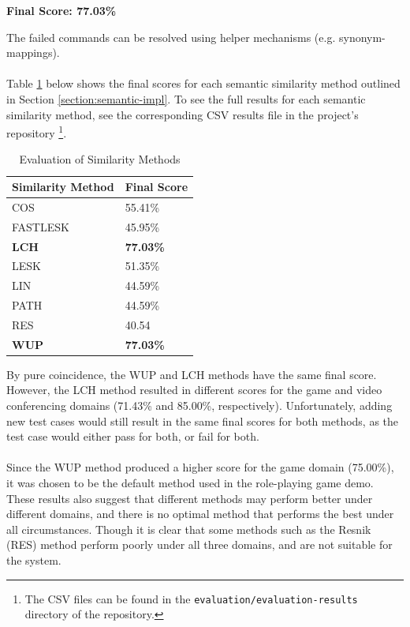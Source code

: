 \documentclass[11pt]{article}
\begin{document}
\begin{center}
\textbf{Final Score: 77.03\%}
\end{center}

The failed commands can be resolved using helper mechanisms (e.g. synonym-mappings).
\\
\\
Table \ref{table:method-results} below shows the final scores for each semantic similarity method outlined in Section \ref{section:semantic-impl}. To see the full results for each semantic similarity method, see the corresponding CSV results file in the project's repository \footnote{The CSV files can be found in the \texttt{evaluation/evaluation-results} directory of the repository.}.

\begin{table}[H]
\centering
\caption{Evaluation of Similarity Methods}
\label{table:method-results}
\begin{tabular}{l|l}
\textbf{Similarity Method} & \textbf{Final Score} \\ \hline
COS                        & 55.41\%              \\ \hline
FASTLESK                   & 45.95\%              \\ \hline
\textbf{LCH}               & \textbf{77.03\%}     \\ \hline
LESK                       & 51.35\%              \\ \hline
LIN                        & 44.59\%              \\ \hline
PATH                       & 44.59\%              \\ \hline
RES                        & 40.54                \\ \hline
\textbf{WUP}               & \textbf{77.03\%}     \\ \hline
\end{tabular}
\end{table}

By pure coincidence, the WUP and LCH methods have the same final score. However, the LCH method resulted in different scores for the game and video conferencing domains (71.43\% and 85.00\%, respectively). Unfortunately, adding new test cases would still result in the same final scores for both methods, as the test case would either pass for both, or fail for both.
\\
\\
Since the WUP method produced a higher score for the game domain (75.00\%), it was chosen to be the default method used in the role-playing game demo. These results also suggest that different methods may perform better under different domains, and there is no optimal method that performs the best under all circumstances. Though it is clear that some methods such as the Resnik (RES) method perform poorly under all three domains, and are not suitable for the system.
\end{document}
